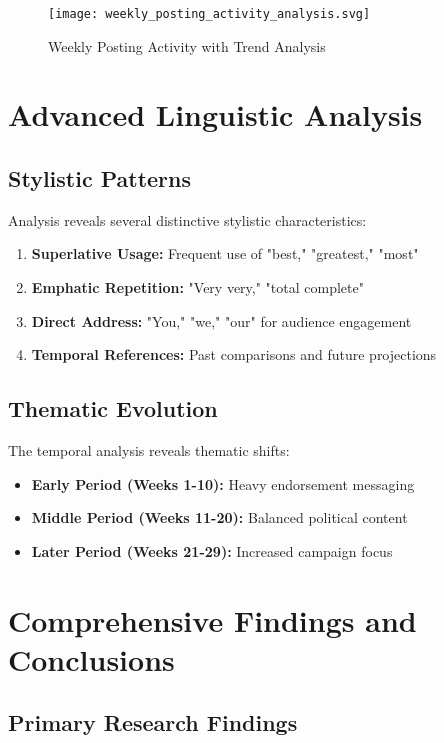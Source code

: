 \documentclass[12pt,a4paper]{article}
\begin{document}
\begin{figure}[H]
\centering
\texttt{[image: weekly\_posting\_activity\_analysis.svg]}
\caption{Weekly Posting Activity with Trend Analysis}
\label{fig:weekly_activity}
\end{figure}

\section{Advanced Linguistic Analysis}

\subsection{Stylistic Patterns}

Analysis reveals several distinctive stylistic characteristics:

\begin{enumerate}
\item \textbf{Superlative Usage:} Frequent use of "best," "greatest," "most"
\item \textbf{Emphatic Repetition:} "Very very," "total complete"
\item \textbf{Direct Address:} "You," "we," "our" for audience engagement
\item \textbf{Temporal References:} Past comparisons and future projections
\end{enumerate}

\subsection{Thematic Evolution}

The temporal analysis reveals thematic shifts:

\begin{itemize}
\item \textbf{Early Period (Weeks 1-10):} Heavy endorsement messaging
\item \textbf{Middle Period (Weeks 11-20):} Balanced political content
\item \textbf{Later Period (Weeks 21-29):} Increased campaign focus
\end{itemize}

\section{Comprehensive Findings and Conclusions}

\subsection{Primary Research Findings}
\end{document}
